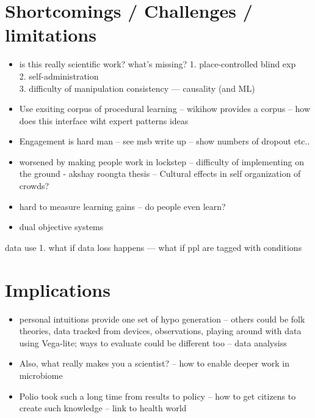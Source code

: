 \section{Shortcomings / Challenges / limitations}
\begin{itemize}
\item is this really scientific work? what’s missing?
1. place-controlled blind exp \\
2. self-administration \\
3. difficulty of manipulation consistency 
---  causality (and ML)   
\item Use exsiting corpus of procedural learning -- wikihow provides a corpus -- how does this interface wiht expert patterns ideas
\item Engagement is hard man -- see msb write up -- show numbers of dropout etc..
\item worsened by making people work in lockstep --  difficulty of implementing on the ground - akshay roongta thesis -- Cultural effects in self organization of crowds?
\item hard to measure learning gains -- do people even learn?
\item dual objective systems

\end{itemize}


data use
1. what if data loss happens — what if ppl are tagged with conditions 




\section{Implications}
\begin{itemize}
\item personal intuitions provide one set of hypo generation -- others could be folk theories, data tracked from devices, observations, playing around with data using Vega-lite; ways to evaluate could be different too -- data analysiss
\item Also, what really makes you a scientist? -- how to enable deeper work in microbiome
\item Polio took such a long time from results to policy --  how to get citizens to create such knowledge -- link to health world
\end{itemize}


